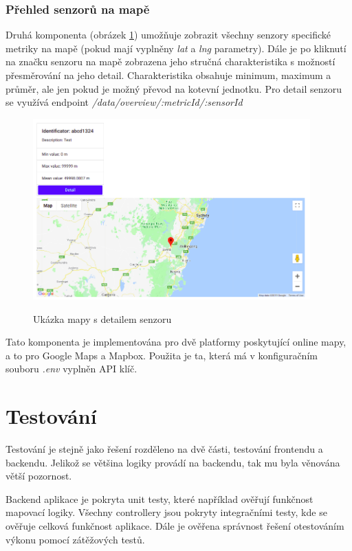 \documentclass[thesis=M,czech]{FITthesis}[2018/10/20]
\begin{document}
\subsection{Přehled senzorů na mapě}
Druhá komponenta (obrázek \ref{fig:overview}) umožňuje zobrazit všechny senzory specifické metriky na mapě (pokud mají vyplněny \textit{lat} a \textit{lng} parametry). Dále je po kliknutí na značku senzoru na mapě zobrazena jeho stručná charakteristika s možností přesměrování na jeho detail. Charakteristika obsahuje minimum, maximum a průměr, ale jen pokud je možný převod na kotevní jednotku. Pro detail senzoru se využívá endpoint \textit{/data/overview/:metricId/:sensorId}
\begin{figure}[h]
\caption{Ukázka mapy s detailem senzoru}
\centering
\includegraphics[width=0.95\textwidth]{overview}
\label{fig:overview}
\end{figure}

Tato komponenta je implementována pro dvě platformy poskytující online mapy, a to pro Google Maps a Mapbox.
Použita je ta, která má v konfiguračním souboru \textit{.env} vyplněn API klíč.


\chapter{Testování}\label{impltest}
Testování je stejně jako řešení rozděleno na dvě části, testování frontendu a backendu. Jelikož se většina logiky provádí na backendu, tak mu byla věnována větší pozornost.
	
	Backend aplikace je pokryta unit testy, které například ověřují funkčnost mapovací logiky. Všechny controllery jsou pokryty integračními testy, kde se ověřuje celková funkčnost aplikace. Dále je ověřena správnost řešení otestováním výkonu pomocí zátěžových testů.
	
\end{document}
